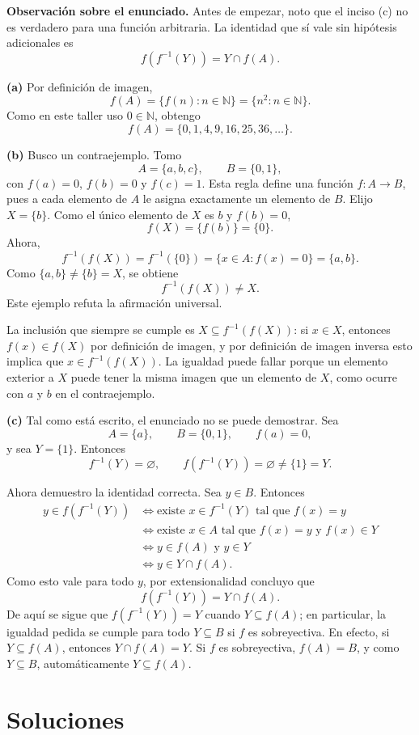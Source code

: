 \documentclass[11pt]{article}
\newcommand{\N}{\mathbb{N}}
\begin{document}
\begin{solution}
\textbf{Observación sobre el enunciado.} Antes de empezar, noto que el inciso (c) no es
verdadero para una función arbitraria. La identidad que sí vale sin hipótesis
adicionales es
\[
f(f^{-1}(Y))=Y\cap f(A).
\]

\textbf{(a)} Por definición de imagen,
\[
f(A)=\{f(n):n\in\N\}=\{n^2:n\in\N\}.
\]
Como en este taller uso $0\in\N$, obtengo
\[
\boxed{f(A)=\{0,1,4,9,16,25,36,\ldots\}}.
\]

\textbf{(b)} Busco un contraejemplo. Tomo
\[
A=\{a,b,c\},\qquad B=\{0,1\},
\]
con $f(a)=0$, $f(b)=0$ y $f(c)=1$. Esta regla define una función
$f:A\to B$, pues a cada elemento de $A$ le asigna exactamente un elemento de
$B$. Elijo $X=\{b\}$. Como el único elemento de $X$ es $b$ y $f(b)=0$,
\[
f(X)=\{f(b)\}=\{0\}.
\]
Ahora,
\[
f^{-1}(f(X))=f^{-1}(\{0\})
=\{x\in A:f(x)=0\}=\{a,b\}.
\]
Como $\{a,b\}\neq\{b\}=X$, se obtiene
\[
f^{-1}(f(X))\neq X.
\]
Este ejemplo refuta la afirmación universal.

La inclusión que siempre se cumple es $X\subseteq f^{-1}(f(X))$: si $x\in X$,
entonces $f(x)\in f(X)$ por definición de imagen, y por definición de imagen
inversa esto implica que $x\in f^{-1}(f(X))$. La igualdad puede fallar porque
un elemento exterior a $X$ puede tener la misma imagen que un elemento de $X$,
como ocurre con $a$ y $b$ en el contraejemplo.

\textbf{(c)} Tal como está escrito, el enunciado no se puede demostrar. Sea
\[
A=\{a\},\qquad B=\{0,1\},\qquad f(a)=0,
\]
y sea $Y=\{1\}$. Entonces
\[
f^{-1}(Y)=\varnothing,
\qquad
f(f^{-1}(Y))=\varnothing\neq\{1\}=Y.
\]

Ahora demuestro la identidad correcta. Sea $y\in B$. Entonces
\begin{align*}
y\in f(f^{-1}(Y))
&\Longleftrightarrow
\text{existe }x\in f^{-1}(Y)\text{ tal que }f(x)=y\\
&\Longleftrightarrow
\text{existe }x\in A\text{ tal que }f(x)=y\text{ y }f(x)\in Y\\
&\Longleftrightarrow y\in f(A)\text{ y }y\in Y\\
&\Longleftrightarrow y\in Y\cap f(A).
\end{align*}
Como esto vale para todo $y$, por extensionalidad concluyo que
\[
\boxed{f(f^{-1}(Y))=Y\cap f(A)}.
\]
De aquí se sigue que $f(f^{-1}(Y))=Y$ cuando $Y\subseteq f(A)$; en particular, la
igualdad pedida se cumple para todo $Y\subseteq B$ si $f$ es sobreyectiva.
En efecto, si $Y\subseteq f(A)$, entonces $Y\cap f(A)=Y$. Si $f$ es
sobreyectiva, $f(A)=B$, y como $Y\subseteq B$, automáticamente
$Y\subseteq f(A)$.
\end{solution}

\clearpage
\section*{Soluciones}
\printsolutions
\end{document}
